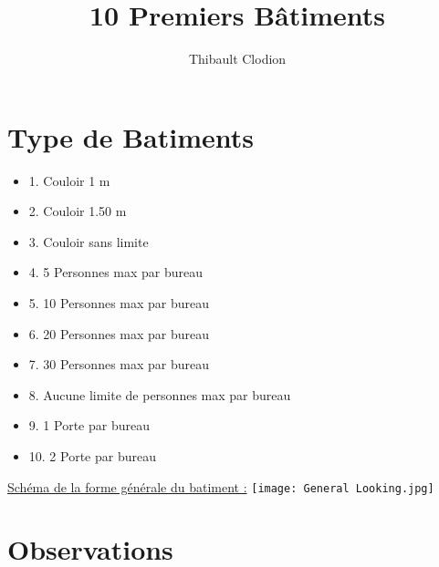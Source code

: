 \documentclass[12pt]{article}
\title{10 Premiers Bâtiments}
\author{Thibault Clodion}
\begin{document}
\maketitle %

\section{Type de Batiments}

\begin{itemize}

\item 1. Couloir 1 m
\item 2. Couloir 1.50 m
\item 3. Couloir sans limite
\item 4. 5 Personnes max par bureau
\item 5. 10 Personnes max par bureau
\item 6. 20 Personnes max par bureau
\item 7. 30 Personnes max par bureau
\item 8. Aucune limite de personnes max par bureau
\item 9. 1 Porte par bureau
\item 10. 2 Porte par bureau

\end{itemize}

\underline{Schéma de la forme générale du batiment :} \newline
\texttt{[image: General Looking.jpg]}

\section{Observations}
\end{document}

